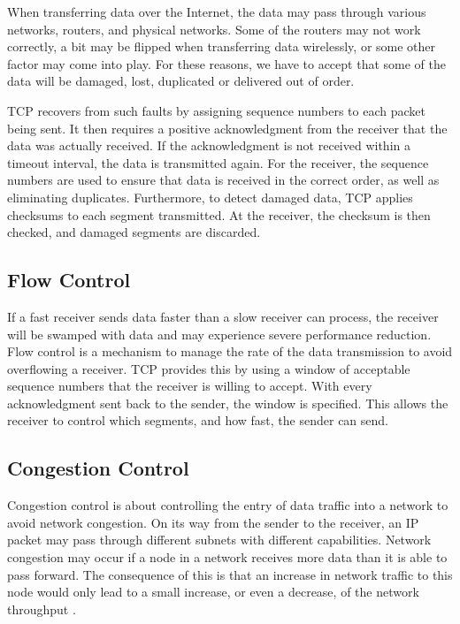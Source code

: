 When transferring data over the Internet, the data may pass through various
networks, routers, and physical networks. Some of the routers may not work
correctly, a bit may be flipped when transferring data wirelessly, or some other
factor may come into play. For these reasons, we have to accept that some of the
data will be damaged, lost, duplicated or delivered out of order.

TCP recovers from such faults by assigning sequence numbers to each packet being
sent. It then requires a positive acknowledgment from the receiver that the
data was actually received. If the acknowledgment is not received within a
timeout interval, the data is transmitted again. For the receiver, the sequence
numbers are used to ensure that data is received in the correct order, as well
as eliminating duplicates. Furthermore, to detect damaged data, TCP applies
checksums to each segment transmitted. At the receiver, the checksum is then
checked, and damaged segments are discarded.

\subsection{Flow Control}

If a fast receiver sends data faster than a slow receiver can process, the
receiver will be swamped with data and may experience severe performance
reduction. Flow control is a mechanism to manage the rate of the data
transmission to avoid overflowing a receiver. TCP provides this by using a
window of acceptable sequence numbers that the receiver is willing to accept.
With every acknowledgment sent back to the sender, the window is specified.
This allows the receiver to control which segments, and how fast, the sender can
send.

\subsection{Congestion Control}

Congestion control is about controlling the entry of data traffic into a network
to avoid network congestion. On its way from the sender to the receiver, an IP
packet may pass through different subnets with different capabilities. Network
congestion may occur if a node in a network receives more data than it is able
to pass forward. The consequence of this is that an increase in network traffic
to this node would only lead to a small increase, or even a decrease, of the
network throughput \cite{Al-Bahadili2012}.

